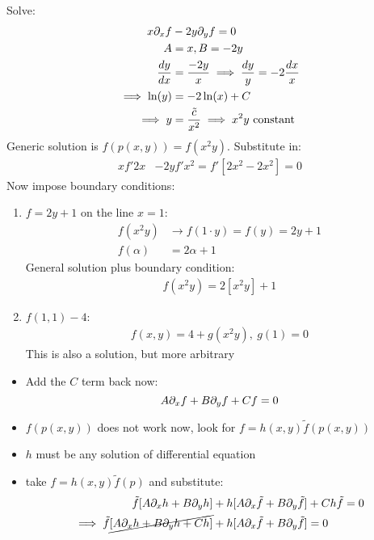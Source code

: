 \documentclass[Maths.tex]{subfiles}
\begin{document}
\begin{example}
Solve:
\begin{align}
	x\partial_xf &- 2y\partial_yf = 0 \\
	A &= x, B = -2y \\
	\frac{dy}{dx} &= \frac{-2y}{x} \implies \frac{dy}{y} = -2\frac{dx}{x} \\
	\implies \ln(y) &= -2\ln(x) + C \\
	\implies y &= \frac{\tilde{c}}{x^2} \implies x^2y \text{ constant}
\end{align}
Generic solution is $f(p(x,y)) = f(x^2y)$. Substitute in:
\begin{align}
	xf'2x &- 2yf'x^2 = f'[2x^2 - 2x^2] = 0
\end{align}
Now impose boundary conditions:
\begin{enumerate}
	\item $f=2y+1$ on the line $x=1$:
	\begin{align}
		f(x^2y) &\to f(1\cdot y) = f(y) = 2y+1 \\
		f(\alpha) &= 2\alpha + 1
	\end{align}
	General solution plus boundary condition:
	\begin{align}
		f(x^2y) = 2[x^2y] + 1
	\end{align}
	\item $f(1,1) - 4$:
	\begin{align}
		f(x,y) = 4 + g(x^2y),~ g(1) = 0
	\end{align}
	This is also a solution, but more arbitrary
\end{enumerate}
\end{example}

\begin{itemize}
	\item Add the $C$ term back now:
	\begin{equation}
		A\partial_xf + B\partial_yf + Cf = 0
	\end{equation}
	\item $f(p(x,y))$ does not work now, look for $f = h(x,y)\tilde{f}(p(x,y))$
	\item $h$ must be any solution of differential equation
	\item take $f = h(x,y)\tilde{f}(p)$ and substitute:
	\begin{align}
		\tilde{f}[A\partial_xh + B\partial_yh] &+ h[A\partial_x\tilde{f} + B\partial_y\tilde{f}] + Ch\tilde{f} = 0 \\
		\implies \tilde{f}\cancel{[A\partial_xh + B\partial_yh + Ch]} &+ h[A\partial_x\tilde{f} + B\partial_y\tilde{f}] = 0
	\end{align}
\end{itemize}
\end{document}
